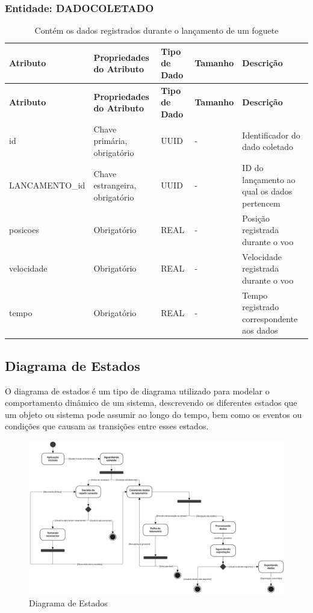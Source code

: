 \subsubsection*{Entidade: DADOCOLETADO}   

\begin{longtable}{|p{3.7cm}|p{2.7cm}|p{1.6cm}|p{1.8cm}|p{4cm}|}
\caption{Contém os dados registrados durante o lançamento de um foguete}
\hline
\textbf{Atributo} & \textbf{Propriedades do Atributo} & \textbf{Tipo de Dado} & \textbf{Tamanho} & \textbf{Descrição} \\
\hline
\endfirsthead

\hline
\textbf{Atributo} & \textbf{Propriedades do Atributo} & \textbf{Tipo de Dado} & \textbf{Tamanho} & \textbf{Descrição} \\
\hline
\endhead

id & Chave primária, obrigatório & UUID & - & Identificador do dado coletado \\
\hline
LANCAMENTO\_id & Chave estrangeira, obrigatório & UUID & - & ID do lançamento ao qual os dados pertencem \\
\hline
posicoes & Obrigatório & REAL & - & Posição registrada durante o voo \\
\hline
velocidade & Obrigatório & REAL & - & Velocidade registrada durante o voo \\
\hline
tempo & Obrigatório & REAL & - & Tempo registrado correspondente aos dados \\
\hline
\end{longtable}


\subsection{Diagrama de Estados}
O diagrama de estados é um tipo de diagrama utilizado para modelar o comportamento dinâmico de um sistema, descrevendo os diferentes estados que um objeto ou sistema pode assumir ao longo do tempo, bem como os eventos ou condições que causam as transições entre esses estados.

\begin{landscape}
\begin{figure}
    \centering
    \includegraphics[width=1\linewidth]{editaveis/figuras/diagrama_de_estados.jpg}
    \caption{Diagrama de Estados}
    \label{fig:enter-label}
\end{figure}
\end{landscape}


